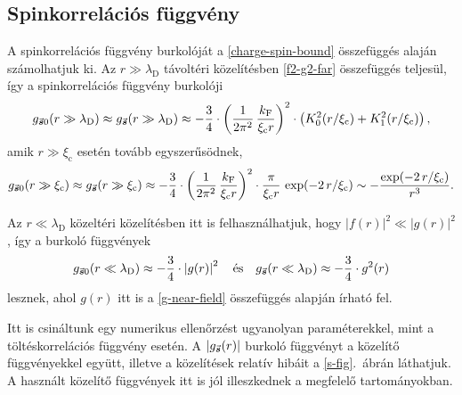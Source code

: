 \documentclass[a4paper,12pt,titlepage]{article}
\newcommand{\kF}{{k_\text{F}}}
\begin{document}
\subsection{Spinkorrelációs függvény}

A spinkorrelációs függvény burkolóját a \eqref{charge-spin-bound} összefüggés alaján számolhatjuk ki.  Az $r \gg \lambda_\text{D}$ távoltéri közelítésben \eqref{f2-g2-far} összefüggés teljesül, így a spinkorrelációs függvény burkolóji
\begin{equation}
	g_{\va*{s} 0}(r \gg \lambda_\text{D}) \approx g_{\va*{s}}(r \gg \lambda_\text{D}) \approx -\frac{3}{4} \cdot \left( \frac{1}{2 \pi^2} \, \frac{\kF}{\xi_\text{c} r} \right)^2 \cdot \left( K_0^2(r / \xi_\text{c}) + K_1^2(r / \xi_\text{c}) \right),
\end{equation}
amik $r \gg \xi_\text{c}$ esetén tovább egyszerűsödnek,
\begin{equation}
	g_{\va*{s} 0}(r \gg \xi_\text{c}) \approx g_{\va*{s}}(r \gg \xi_\text{c}) \approx -\frac{3}{4} \cdot \left( \frac{1}{2 \pi^2} \, \frac{\kF}{\xi_\text{c} r} \right)^2 \cdot \frac{\pi}{\xi_\text{c} r} \, \exp(-2 \, r / \xi_\text{c}) \sim -\frac{\exp(-2 \, r / \xi_\text{c})}{r^3}.
\end{equation}

Az $r \ll \lambda_\text{D}$ közeltéri közelítésben itt is felhasználhatjuk, hogy $\left| f(r) \right|^2 \ll \left| g(r) \right|^2$, így a burkoló függvények
\begin{equation}
	g_{\va*{s} 0}(r \ll \lambda_\text{D}) \approx -\frac{3}{4} \cdot \left| g(r) \right|^2 ~~~ \text{és} ~~~ g_{\va*{s}}(r \ll \lambda_\text{D}) \approx -\frac{3}{4} \cdot g^2(r)
\end{equation}
lesznek, ahol $g(r)$ itt is a \eqref{g-near-field} összefüggés alapján írható fel.

Itt is csináltunk egy numerikus ellenőrzést ugyanolyan paraméterekkel, mint a töltéskorrelációs függvény esetén.  A $\left| g_{\va*{s}}(r) \right|$ burkoló függvényt a közelítő függvényekkel együtt, illetve a közelítések relatív hibáit a \ref{s-fig}.\ ábrán láthatjuk.  A használt közelítő függvények itt is jól illeszkednek a megfelelő tartományokban.
\end{document}

